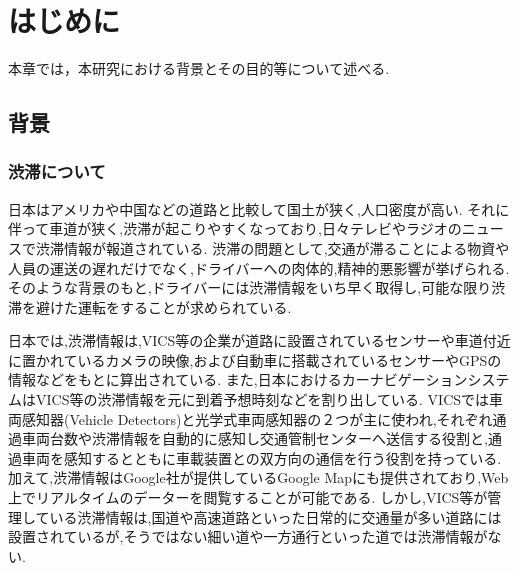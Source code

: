 \chapter{はじめに}
本章では，本研究における背景とその目的等について述べる.
\section{背景}
\subsection{渋滞について}
日本はアメリカや中国などの道路と比較して国土が狭く,人口密度が高い.
それに伴って車道が狭く,渋滞が起こりやすくなっており,日々テレビやラジオのニュースで渋滞情報が報道されている.
渋滞の問題として,交通が滞ることによる物資や人員の運送の遅れだけでなく,ドライバーへの肉体的,精神的悪影響が挙げられる.
そのような背景のもと,ドライバーには渋滞情報をいち早く取得し,可能な限り渋滞を避けた運転をすることが求められている.

日本では,渋滞情報は,VICS等の企業が道路に設置されているセンサーや車道付近に置かれているカメラの映像,および自動車に搭載されているセンサーやGPSの情報などをもとに算出されている.
また,日本におけるカーナビゲーションシステムはVICS\cite{vics}等の渋滞情報を元に到着予想時刻などを割り出している.
VICSでは車両感知器(Vehicle Detectors)と光学式車両感知器の２つが主に使われ,それぞれ通過車両台数や渋滞情報を自動的に感知し交通管制センターへ送信する役割と,通過車両を感知するとともに車載装置との双方向の通信を行う役割を持っている.
加えて,渋滞情報はGoogle社が提供しているGoogle Mapにも提供されており,Web上でリアルタイムのデーターを閲覧することが可能である.
しかし,VICS等が管理している渋滞情報は,国道や高速道路といった日常的に交通量が多い道路には設置されているが,そうではない細い道や一方通行といった道では渋滞情報がない.

